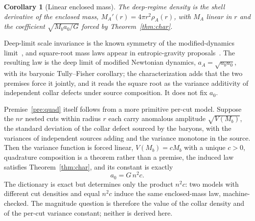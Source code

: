 \documentclass[11pt]{article}
\newtheorem{corollary}[theorem]{Corollary}
\begin{document}
\begin{corollary}[Linear enclosed mass]
\label{pre:linear}
The deep-regime density is the shell derivative of the enclosed mass,
\(M_A'(r)=4\pi r^2\rho_A(r)\), with \(M_A\) linear in \(r\) and the
coefficient \(\sqrt{M_ba_0/G}\) forced by
Theorem~\ref{thm:char}.
\end{corollary}

Deep-limit scale invariance is the known symmetry of the modified-dynamics
limit~\cite{milgrom2009}, and square-root mass laws appear in
entropic-gravity proposals~\cite{verlinde2016}. The resulting law is the
deep limit of modified Newtonian dynamics, \(a_A=\sqrt{a_ba_0}\), with its
baryonic Tully--Fisher corollary; the characterization adds that the two
premises force it jointly, and it reads the square root as the variance
additivity of independent collar defects under source composition. It does
not fix \(a_0\).

Premise~\ref{pre:quad} itself follows from a more primitive per-cut model.
Suppose the \(nr\) nested cuts within radius \(r\) each carry anomalous
amplitude \(\sqrt{V(M_b)}\), the standard deviation of the collar defect
sourced by the baryons, with the variances of independent sources adding
and the variance monotone in the source. Then the variance function is
forced linear, \(V(M_b)=cM_b\) with a unique \(c>0\), quadrature
composition is a theorem rather than a premise, the induced law satisfies
Theorem~\ref{thm:char}, and its constant is exactly
\begin{equation}
a_0=G\,n^2c .
\label{eq:dictionary}
\end{equation}
The dictionary is exact but determines only the product \(n^2c\): two
models with different cut densities and equal \(n^2c\) induce the same
enclosed-mass law, machine-checked. The magnitude question is therefore
the value of the collar density and of the per-cut variance constant;
neither is derived here.
\end{document}
